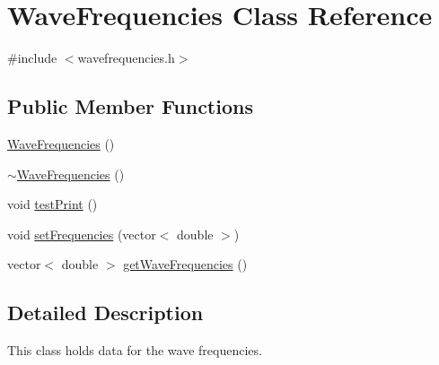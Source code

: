 \hypertarget{class_wave_frequencies}{\section{Wave\-Frequencies Class Reference}
\label{class_wave_frequencies}
}


{\ttfamily \#include $<$wavefrequencies.\-h$>$}

\subsection*{Public Member Functions}
\begin{DoxyCompactItemize}
\item 
\hyperlink{class_wave_frequencies_a73e5875ec967740fdb4fc71a9a9926be}{Wave\-Frequencies} ()
\item 
\hyperlink{class_wave_frequencies_a9ef33af9d3e9a9d79efeb01a8e47fdfc}{$\sim$\-Wave\-Frequencies} ()
\item 
void \hyperlink{class_wave_frequencies_aa66fd622bc69469a8fb43619f6096f1f}{test\-Print} ()
\item 
void \hyperlink{class_wave_frequencies_ad8f27f97cfb137efdec72611e7cdf3b5}{set\-Frequencies} (vector$<$ double $>$)
\item 
vector$<$ double $>$ \hyperlink{class_wave_frequencies_aeb7a093e24733af741c05f1499d776c3}{get\-Wave\-Frequencies} ()
\end{DoxyCompactItemize}


\subsection{Detailed Description}
This class holds data for the wave frequencies. 

